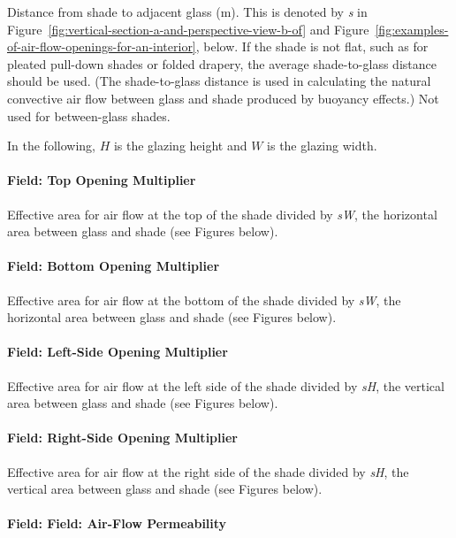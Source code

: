 Distance from shade to adjacent glass (m). This is denoted by \emph{s} in Figure~\ref{fig:vertical-section-a-and-perspective-view-b-of} and Figure~\ref{fig:examples-of-air-flow-openings-for-an-interior}, below. If the shade is not flat, such as for pleated pull-down shades or folded drapery, the average shade-to-glass distance should be used. (The shade-to-glass distance is used in calculating the natural convective air flow between glass and shade produced by buoyancy effects.) Not used for between-glass shades.

In the following, $H$ is the glazing height and $W$ is the glazing width.

\paragraph{Field: Top Opening Multiplier}\label{field-top-opening-multiplier}

Effective area for air flow at the top of the shade divided by \emph{sW}, the horizontal area between glass and shade (see Figures below).

\paragraph{Field: Bottom Opening Multiplier}\label{field-bottom-opening-multiplier}

Effective area for air flow at the bottom of the shade divided by \emph{sW}, the horizontal area between glass and shade (see Figures below).

\paragraph{Field: Left-Side Opening Multiplier}\label{field-left-side-opening-multiplier}

Effective area for air flow at the left side of the shade divided by \emph{sH}, the vertical area between glass and shade (see Figures below).

\paragraph{Field: Right-Side Opening Multiplier}\label{field-right-side-opening-multiplier}

Effective area for air flow at the right side of the shade divided by \emph{sH}, the vertical area between glass and shade (see Figures below).

\paragraph{Field: Field: Air-Flow Permeability}\label{field-field-air-flow-permeability}

